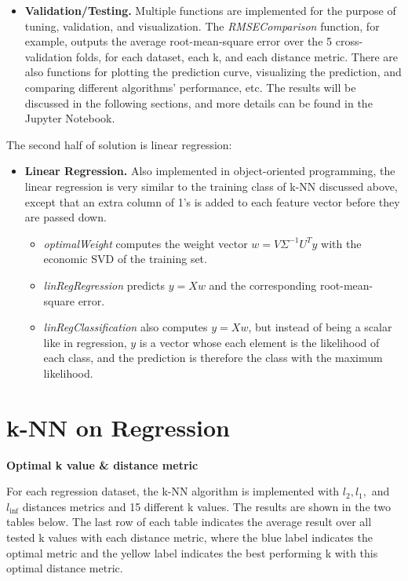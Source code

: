 \documentclass{article} %
\begin{document}
\begin{itemize}
\begin{itemize}
  \end{itemize}
  \item \textbf{Validation/Testing.} Multiple functions are implemented for the purpose of tuning, validation, and visualization. The \textit{RMSEComparison} function, for example, outputs the average root-mean-square error over the 5 cross-validation folds, for each dataset, each k, and each distance metric. There are also functions for plotting the prediction curve, visualizing the prediction, and comparing different algorithms' performance, etc. The results will be discussed in the following sections, and more details can be found in the Jupyter Notebook.
\end{itemize}
The second half of solution is linear regression:
\begin{itemize}
  \item \textbf{Linear Regression.} Also implemented in object-oriented programming, the linear regression is very similar to the training class of k-NN discussed above, except that an extra column of 1's is added to each feature vector before they are passed down.
  \begin{itemize}
    \item \textit{optimalWeight} computes the weight vector $w = V\Sigma^{-1}U^Ty$ with the economic SVD of the training set.
    \item \textit{linRegRegression} predicts $y = Xw$ and the corresponding root-mean-square error.
    \item \textit{linRegClassification} also computes $y = Xw$, but instead of being a scalar like in regression, $y$ is a vector whose each element is the likelihood of each class, and the prediction is therefore the class with the maximum likelihood.
  \end{itemize}
\end{itemize}



\vspace{0.4cm}
\section*{k-NN on Regression} %

\textbf{Optimal k value \& distance metric}

  For each regression dataset, the k-NN algorithm is implemented with $l_2, l_1,$ and $l_{\inf}$ distances metrics and 15 different k values. The results are shown in the two tables below. The last row of each table indicates the average result over all tested k values with each distance metric, where the blue label indicates the optimal metric and the yellow label indicates the best performing k with this optimal distance metric.
\end{document}
